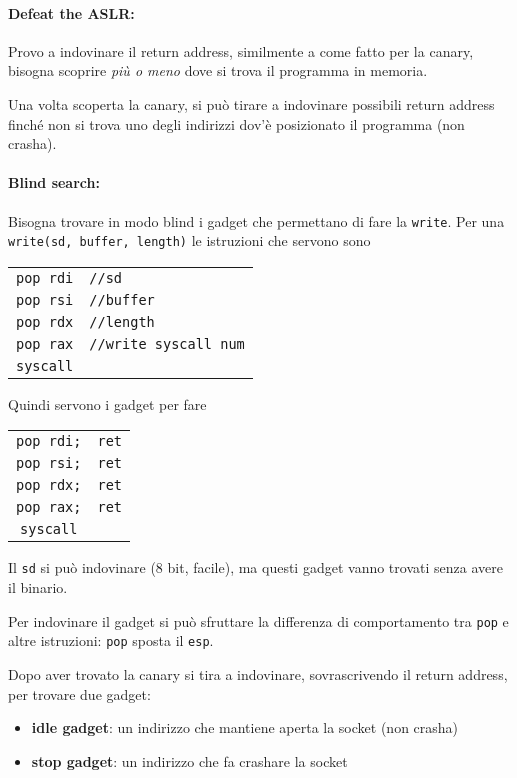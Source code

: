 \paragraph{Defeat the ASLR:} Provo a indovinare il return address, similmente a come fatto per la canary, bisogna scoprire \textit{più o meno} dove si trova il programma in memoria.

Una volta scoperta la canary, si può tirare a indovinare possibili return address finché non si trova uno degli indirizzi dov'è posizionato il programma (non crasha).

\paragraph{Blind search:} Bisogna trovare in modo blind i gadget che permettano di fare la \texttt{write}. Per una \texttt{write(sd, buffer, length)} le istruzioni che servono sono

\begin{tabular}{c l}
	\texttt{pop rdi} & \texttt{//sd} \\
	\texttt{pop rsi} & \texttt{//buffer} \\
	\texttt{pop rdx} & \texttt{//length} \\
	\texttt{pop rax} & \texttt{//write syscall num} \\
	\texttt{syscall} & \\
\end{tabular}

Quindi servono i gadget per fare

\begin{tabular}{c c}
	\texttt{pop rdi;} & \texttt{ret} \\
	\texttt{pop rsi;} & \texttt{ret} \\
	\texttt{pop rdx;} & \texttt{ret} \\
	\texttt{pop rax;} & \texttt{ret} \\
	\texttt{syscall} & \\
\end{tabular}

Il \texttt{sd} si può indovinare (8 bit, facile), ma questi gadget vanno trovati senza avere il binario. 

Per indovinare il gadget si può sfruttare la differenza di comportamento tra \texttt{pop} e altre istruzioni: \texttt{pop} sposta il \texttt{esp}. 

Dopo aver trovato la canary si tira a indovinare, sovrascrivendo il return address, per trovare due gadget:
\begin{itemize}
	\item \textbf{idle gadget}: un indirizzo che mantiene aperta la socket (non crasha)
    
	\item \textbf{stop gadget}: un indirizzo che fa crashare la socket
\end{itemize}

